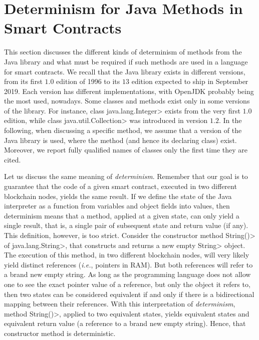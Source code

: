 \section{Determinism for Java Methods in Smart Contracts}\label{sec:determinism}

This section discusses the different kinds of determinism of methods from
the Java library and what must be required if such methods are used
in a language for smart contracts.
We recall that the Java library exists in different versions, from its first
$1.0$ edition of 1996 to its $13$ edition expected to ship in September 2019.
Each version has different implementations, with OpenJDK probably being
the most used, nowadays. Some classes and methods exist only in some versions of the library.
For instance, class \<java.lang.Integer> exists from the very first $1.0$ edition,
while class \<java.util.Collection> was introduced in version $1.2$.
In the following, when discussing a specific method, we assume that a version
of the Java library is used, where the method (and hence its declaring class) exist.
Moreover, we report fully qualified names of classes only the first time they are cited.

Let us discuss the same meaning of \emph{determinism}. Remember that
our goal is to guarantee that the code of a given smart contract, executed
in two different blockchain nodes, yields the same result.
If we define the state
of the Java interpreter as a function from variables and object fields into values, then
determinism means that a method, applied at a given state, can only yield a single result,
that is, a single pair of subsequent state and return value (if any).
This definition, however, is too strict. Consider the constructor method
\<String()> of \<java.lang.String>, that constructs and returns a new empty \<String>
object. The execution of this method, in two different blockchain nodes,
will very likely yield distinct references (\emph{i.e.}, pointers in RAM).
But both references will refer to a brand new empty string.
As long as the programming language does not allow one to see
the exact pointer value of a reference, but only the object it refers to,
then two states can be considered equivalent if and only if there is
a bidirectional mapping between their references.
With this interpretation of \emph{determinism}, method \<String()>, applied to two equivalent
states, yields equivalent states and equivalent return value (a reference to
a brand new empty string).
Hence, that constructor method is deterministic.

